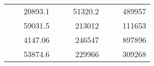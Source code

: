 \begin{table}[H]
\begin{tabular}{|ccrccrccc}
\rowcolor[HTML]{DDFDFF} 
\multicolumn{1}{|c|}{\cellcolor[HTML]{FFFFC7}}                                & \multicolumn{1}{c|}{\cellcolor[HTML]{DDFDFF}}                      & \multicolumn{1}{r|}{\cellcolor[HTML]{DAE8FC}20893.1}   & \multicolumn{1}{c|}{\cellcolor[HTML]{FFFFC7}}                                & \multicolumn{1}{c|}{\cellcolor[HTML]{DDFDFF}}                       & \multicolumn{1}{r|}{\cellcolor[HTML]{DDFDFF}51320.2}   & \multicolumn{1}{c|}{\cellcolor[HTML]{FFFFC7}}                                & \multicolumn{1}{c|}{\cellcolor[HTML]{DDFDFF}}                      & \multicolumn{1}{r|}{\cellcolor[HTML]{DDFDFF}489957}    \\ \cline{3-3} \cline{6-6} \cline{9-9} 
\multicolumn{1}{|c|}{\cellcolor[HTML]{FFFFC7}}                                & \multicolumn{1}{c|}{\cellcolor[HTML]{DDFDFF}}                      & \multicolumn{1}{r|}{\cellcolor[HTML]{DDFDFF}59031.5}   & \multicolumn{1}{c|}{\cellcolor[HTML]{FFFFC7}}                                & \multicolumn{1}{c|}{\cellcolor[HTML]{DDFDFF}}                       & \multicolumn{1}{r|}{\cellcolor[HTML]{DAE8FC}213012}    & \multicolumn{1}{c|}{\cellcolor[HTML]{FFFFC7}}                                & \multicolumn{1}{c|}{\cellcolor[HTML]{DDFDFF}}                      & \multicolumn{1}{r|}{\cellcolor[HTML]{DAE8FC}111653}    \\ \cline{3-3} \cline{6-6} \cline{9-9} 
\rowcolor[HTML]{DDFDFF} 
\multicolumn{1}{|c|}{\cellcolor[HTML]{FFFFC7}}                                & \multicolumn{1}{c|}{\cellcolor[HTML]{DDFDFF}}                      & \multicolumn{1}{r|}{\cellcolor[HTML]{DAE8FC}4147.06}   & \multicolumn{1}{c|}{\cellcolor[HTML]{FFFFC7}}                                & \multicolumn{1}{c|}{\cellcolor[HTML]{DDFDFF}}                       & \multicolumn{1}{r|}{\cellcolor[HTML]{DDFDFF}246547}    & \multicolumn{1}{c|}{\cellcolor[HTML]{FFFFC7}}                                & \multicolumn{1}{c|}{\cellcolor[HTML]{DDFDFF}}                      & \multicolumn{1}{r|}{\cellcolor[HTML]{DDFDFF}897896}    \\ \cline{3-3} \cline{6-6} \cline{9-9} 
\multicolumn{1}{|c|}{\cellcolor[HTML]{FFFFC7}}                                & \multicolumn{1}{c|}{\cellcolor[HTML]{DDFDFF}}                      & \multicolumn{1}{r|}{\cellcolor[HTML]{DDFDFF}53874.6}   & \multicolumn{1}{c|}{\cellcolor[HTML]{FFFFC7}}                                & \multicolumn{1}{c|}{\cellcolor[HTML]{DDFDFF}}                       & \multicolumn{1}{r|}{\cellcolor[HTML]{DAE8FC}229966}    & \multicolumn{1}{c|}{\cellcolor[HTML]{FFFFC7}}                                & \multicolumn{1}{c|}{\cellcolor[HTML]{DDFDFF}}                      & \multicolumn{1}{r|}{\cellcolor[HTML]{DAE8FC}309268}    \\ \cline{3-3} \cline{6-6} \cline{9-9} 

\end{tabular}
\end{table}
